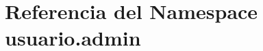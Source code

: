 \hypertarget{namespaceusuario_1_1admin}{}\section{Referencia del Namespace usuario.\+admin}
\label{namespaceusuario_1_1admin}
